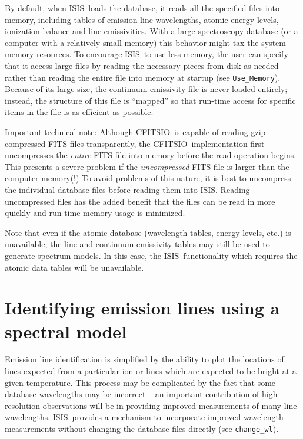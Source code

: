 \documentclass{book}
\newcommand{\isisx}{{\sc ISIS~}}
\newcommand{\isis}{{\sc ISIS}}
\newcommand{\cfitsio}{{\sc CFITSIO}}
\begin{document}
{By default, when \isisx loads the database, it reads all the specified files
into memory, including tables of emission line wavelengths, atomic energy
levels, ionization balance and line emissivities.  With a large
spectroscopy database (or a computer with a relatively small memory) this
behavior might tax the system memory resources. To encourage \isisx to use
less memory, the user can specify that it access large files by reading the
necessary pieces from disk as needed rather than reading the entire file
into memory at startup (see \verb|Use_Memory|).  Because of its large size,
the continuum emissivity file is never loaded entirely; instead, the
structure of this file is ``mapped'' so that run-time access for specific
items in the file is as efficient as possible.

Important technical note: Although \cfitsio\ is capable of reading
gzip-compressed FITS files transparently, the \cfitsio\ implementation first
uncompresses the {\it entire} FITS file into memory before the read operation
begins. This presents a severe problem if the {\it uncompressed} FITS file is
larger than the computer memory(!) To avoid problems of this nature, it is
best to uncompress the individual database files before reading them into
\isis. Reading uncompressed files has the added benefit that the files can
be read in more quickly and run-time memory usage is minimized.

Note that even if the atomic database (wavelength tables, energy levels,
etc.) is unavailable, the line and continuum emissivity tables may still be
used to generate spectrum models.  In this case, the \isisx functionality
which requires the atomic data tables will be unavailable.

\section{Identifying emission lines using a spectral model}

Emission line identification is simplified by the ability to plot the
locations of lines expected from a particular ion or lines which are
expected to be bright at a given temperature.  This process may be
complicated by the fact that some database wavelengths may be incorrect --
an important contribution of high-resolution observations will be in
providing improved measurements of many line wavelengths.  \isisx provides a
mechanism to incorporate improved wavelength measurements without changing
the database files directly (see {\tt change\_wl}).

}
\end{document}

